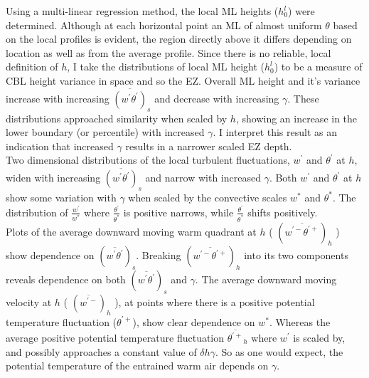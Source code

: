 Using a multi-linear regression method, the local \acs{ML} heights ($h^{l}_{0}$) 
were determined.  Although at each horizontal point an \acs{ML} of almost uniform $\theta$ based on the local profiles is evident, the region directly above it differs depending on location as well as from the average profile. 
Since there is no reliable, local definition of $h$, 
I take the distributions of local \acs{ML} height ($h^{l}_{0}$) to be a measure of \acs{CBL} height variance in space and so the \acs{EZ}. Overall \acs{ML} height and it's variance increase with increasing $\overline{(w^{'}\theta^{'})}_{s}$ and decrease with increasing $\gamma$. These distributions approached similarity when scaled by $h$, showing an increase in the lower boundary (or percentile) with increased $\gamma$.  I interpret this result as an indication that increased $\gamma$ results in a narrower scaled \acs{EZ} depth.\\

Two dimensional distributions of the local turbulent fluctuations, $w^{'}$ and $\theta^{'}$ at $h$, widen with increasing $\overline{(w^{'}\theta^{'})}_{s}$ and narrow with increased $\gamma$.  Both $w^{'}$ and $\theta^{'}$ at $h$ show some variation with $\gamma$ when scaled by the convective scales $w^{*}$ and $\theta^{*}$.  The distribution of $\frac{w^{'}}{w^{*}}$ where $\frac{\theta^{'}}{\theta^{*}}$ is positive narrows, while $\frac{\theta^{'}}{\theta^{*}}$ shifts positively.\\

Plots of the average downward moving warm quadrant at $h$ ( $(\overline{w^{'-}\theta^{'+}})_{h}$ ) show dependence on $(\overline{w^{'}\theta^{'}})_{s}$. Breaking $(\overline{w^{'-}\theta^{'+}})_{h}$ into its two components reveals dependence on both $(\overline{w^{'}\theta^{'}})_{s}$ and $\gamma$. The average downward moving velocity at $h$ ( $(\overline{w^{'-}})_{h}$ ), at points where there is a positive potential temperature fluctuation ($\theta^{'+}$), show clear dependence on $w^{*}$.  Whereas the average positive potential temperature fluctuation $\overline{\theta^{'+}}_{h}$ where $w^{'}$ is scaled by, and possibly approaches a constant value of $\delta h \gamma$. So as one would expect, the potential temperature of the entrained warm air depends on $\gamma$.

\clearpage


